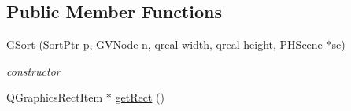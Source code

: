 \subsection*{Public Member Functions}
\begin{DoxyCompactItemize}
\item 
\hyperlink{classGSort_a944275172f65a74c9e87bec7032a7637}{G\+Sort} (Sort\+Ptr p, \hyperlink{structGVNode}{G\+V\+Node} n, qreal width, qreal height, \hyperlink{classPHScene}{P\+H\+Scene} $\ast$sc)
\begin{DoxyCompactList}\small\item\em constructor \end{DoxyCompactList}\item 
\hypertarget{classGSort_a06a2e1dd2dec8cad77c17ceb75c6b93b}{Q\+Graphics\+Rect\+Item $\ast$ \hyperlink{classGSort_a06a2e1dd2dec8cad77c17ceb75c6b93b}{get\+Rect} ()}\label{classGSort_a06a2e1dd2dec8cad77c17ceb75c6b93b}


\end{DoxyCompactItemize}
